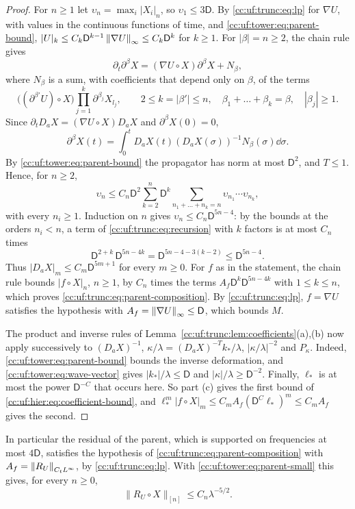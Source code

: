 \begin{proof}
For $n\ge1$ let $\upsilon_n=\max_i|X_i|_n$, so
$\upsilon_1\le3\mathsf D$. By \eqref{cc:uf:trunc:eq:lp} for $\nabla U$,
with values in the continuous functions of time, and
\eqref{cc:uf:tower:eq:parent-bound},
$|U|_k\le C_k\mathsf D^{k-1}\left\lVert\nabla U\right\rVert_\infty\le C_k\mathsf D^k$
for $k\ge1$. For $|\beta|=n\ge2$, the chain rule gives
\[
 \partial_t\partial^\beta X=(\nabla U\circ X)\partial^\beta X+N_\beta,
\]
where $N_\beta$ is a sum, with coefficients that depend only on $\beta$,
of the terms
\[
 \bigl((\partial^{\beta'}U)\circ X\bigr)
 \prod_{j=1}^k\partial^{\beta_j}X_{l_j},\qquad
 2\le k=|\beta'|\le n,\quad \beta_1+\dots+\beta_k=\beta,\quad|\beta_j|\ge1.
\]
Since $\partial_t D_aX=(\nabla U\circ X)D_aX$ and
$\partial^\beta X(0)=0$,
\[
 \partial^\beta X(t)
 =\int_0^tD_aX(t)(D_aX(\sigma))^{-1}N_\beta(\sigma)\dd\sigma.
\]
By \eqref{cc:uf:tower:eq:parent-bound} the propagator has norm at most
$\mathsf D^2$, and $T\le1$. Hence, for $n\ge2$,
\begin{equation}\label{cc:uf:trunc:eq:recursion}
 \upsilon_n\le C_n\mathsf D^2\sum_{k=2}^n\mathsf D^k
 \sum_{n_1+\dots+n_k=n}\upsilon_{n_1}\cdots\upsilon_{n_k},
\end{equation}
with every $n_i\ge1$. Induction on $n$ gives
$\upsilon_n\le C_n\mathsf D^{5n-4}$: by the bounds at the orders
$n_i<n$, a term of \eqref{cc:uf:trunc:eq:recursion} with $k$ factors is
at most $C_n$ times
\[
 \mathsf D^{2+k}\,\mathsf D^{5n-4k}
 =\mathsf D^{5n-4-3(k-2)}\le\mathsf D^{5n-4} .
\]
Thus
$|D_aX|_m\le C_m\mathsf D^{5m+1}$ for every $m\ge0$. For $f$ as in
the statement, the chain rule bounds $|f\circ X|_n$, $n\ge1$, by $C_n$
times the terms $A_f\mathsf D^k\mathsf D^{5n-4k}$ with
$1\le k\le n$, which proves \eqref{cc:uf:trunc:eq:parent-composition}.
By \eqref{cc:uf:trunc:eq:lp}, $f=\nabla U$ satisfies the hypothesis with
$A_f=\left\lVert\nabla U\right\rVert_\infty\le\mathsf D$, which bounds $M$.

The product and inverse rules of Lemma~\ref{cc:uf:trunc:lem:coefficients}(a),(b)
now apply successively to $(D_aX)^{-1}$, $\kappa/\lambda=(D_aX)^{-T}k_*/\lambda$,
$|\kappa/\lambda|^{-2}$ and $P_\kappa$.
Indeed, \eqref{cc:uf:tower:eq:parent-bound} bounds the inverse deformation,
and \eqref{cc:uf:tower:eq:wave-vector} gives $|k_*|/\lambda\le\mathsf D$
and $|\kappa|/\lambda\ge\mathsf D^{-2}$.
Finally, $\ell_*$ is at most the power $\mathsf D^{-C}$ that occurs
here. So part (c) gives the first bound of
\eqref{cc:uf:hier:eq:coefficient-bound}, and
$\ell_*^m|f\circ X|_m\le C_mA_f(\mathsf D^C\ell_*)^m\le C_mA_f$ gives
the second.
\end{proof}

In particular the residual of the parent, which is supported on
frequencies at most $4\mathsf D$, satisfies the hypothesis of
\eqref{cc:uf:trunc:eq:parent-composition} with $A_f=\left\lVert R_U\right\rVert_{C_tL^\infty}$,
by \eqref{cc:uf:trunc:eq:lp}. With \eqref{cc:uf:tower:eq:parent-small}
this gives, for every $n\ge0$,
\begin{equation}\label{cc:uf:hier:eq:parent-residual}
 \|R_U\circ X\|_{[n]}\le C_n\lambda^{-5/2}.
\end{equation}
